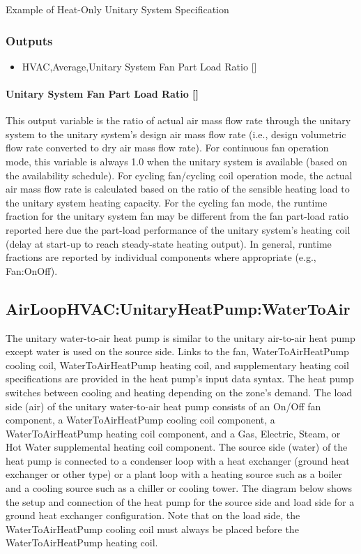 Example of Heat-Only Unitary System Specification

\subsubsection{Outputs}\label{outputs-5-011}

\begin{itemize}
\tightlist
\item
  HVAC,Average,Unitary System Fan Part Load Ratio {[]}
\end{itemize}

\paragraph{\texorpdfstring{Unitary System Fan Part Load Ratio {[]}}{Unitary System Fan Part Load Ratio }}\label{unitary-system-fan-part-load-ratio-6}

This output variable is the ratio of actual air mass flow rate through the unitary system to the unitary system's design air mass flow rate (i.e., design volumetric flow rate converted to dry air mass flow rate). For continuous fan operation mode, this variable is always 1.0 when the unitary system is available (based on the availability schedule). For cycling fan/cycling coil operation mode, the actual air mass flow rate is calculated based on the ratio of the sensible heating load to the unitary system heating capacity. For the cycling fan mode, the runtime fraction for the unitary system fan may be different from the fan part-load ratio reported here due the part-load performance of the unitary system's heating coil (delay at start-up to reach steady-state heating output). In general, runtime fractions are reported by individual components where appropriate (e.g., Fan:OnOff).

\subsection{AirLoopHVAC:UnitaryHeatPump:WaterToAir}\label{airloophvacunitaryheatpumpwatertoair}

The unitary water-to-air heat pump is similar to the unitary air-to-air heat pump except water is used on the source side. Links to the fan, WaterToAirHeatPump cooling coil, WaterToAirHeatPump heating coil, and supplementary heating coil specifications are provided in the heat pump's input data syntax. The heat pump switches between cooling and heating depending on the zone's demand. The load side (air) of the unitary water-to-air heat pump consists of an On/Off fan component, a WaterToAirHeatPump cooling coil component, a WaterToAirHeatPump heating coil component, and a Gas, Electric, Steam, or Hot Water supplemental heating coil component. The source side (water) of the heat pump is connected to a condenser loop with a heat exchanger (ground heat exchanger or other type) or a plant loop with a heating source such as a boiler and a cooling source such as a chiller or cooling tower. The diagram below shows the setup and connection of the heat pump for the source side and load side for a ground heat exchanger configuration. Note that on the load side, the WaterToAirHeatPump cooling coil must always be placed before the WaterToAirHeatPump heating coil.

